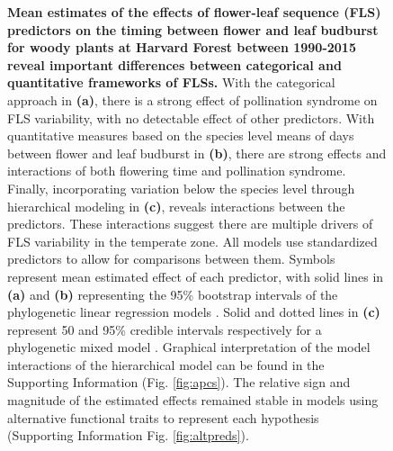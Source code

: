 \documentclass[11pt]{article}
\begin{document}
\pagebreak  

 \begin{figure}[h!]
        \centering
          \caption{\textbf{Mean estimates of the effects of flower-leaf sequence (FLS) predictors on the timing between flower and leaf budburst for woody plants at Harvard Forest between 1990-2015 reveal important differences between categorical and quantitative frameworks of FLSs.}  With the categorical approach in \textbf{(a)}, there is a strong effect of  pollination syndrome on FLS variability, with no detectable effect of other predictors. With quantitative measures based on the species level means of days between flower and leaf budburst in \textbf{(b)}, there are strong effects and interactions of both flowering time and pollination syndrome. Finally, incorporating variation below the species level through hierarchical modeling in \textbf{(c)}, reveals interactions between the predictors. These interactions suggest there are multiple drivers of FLS variability in the temperate zone. All models use standardized predictors to allow for comparisons between them. Symbols represent mean estimated effect of each predictor, with solid lines in \textbf{(a)} and \textbf{(b)} representing the 95\% bootstrap intervals of the phylogenetic linear regression models \citep{Ives2010}. Solid and dotted lines in \textbf{(c)} represent 50 and 95\% credible intervals respectively for a phylogenetic mixed model \citep{Garamszegi2014}. Graphical interpretation of the model interactions of the hierarchical model can be found in the Supporting Information (Fig. \ref{fig:apcs}). The relative sign and magnitude of the estimated effects remained stable in models using alternative functional traits to represent each hypothesis (Supporting Information Fig. \ref{fig:altpreds}).}  
        \label{fig:muplotsHF}
    \end{figure}    


    
\end{document}
